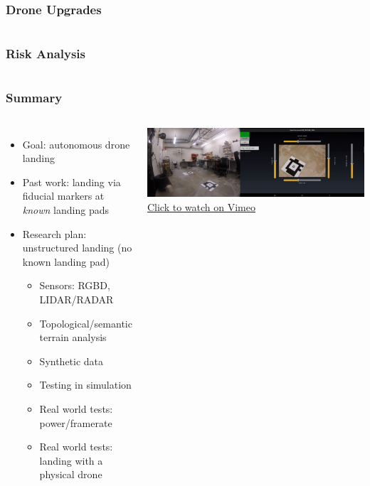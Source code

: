 \documentclass[aspectratio=169]{rubeamer}
\newif\ifpause
\newcommand{\mypause}{\ifpause \pause \fi}
\begin{document}
\begin{frame}
  \frametitle{Drone Upgrades}
  \begin{columns}
    \centering
  \end{columns}
\end{frame}

\begin{frame}
  \frametitle{Risk Analysis}
  \begin{columns}
    \centering
  \end{columns}
\end{frame}

\begin{frame}
  \frametitle{Summary}
  \begin{columns}
      \begin{itemize}
        \mypause
        \item Goal: autonomous drone landing
        \mypause
        \item Past work: landing via fiducial markers at \textit{known} landing pads
        \mypause
        \item Research plan: unstructured landing (no known landing pad)
        \begin{itemize}
          \mypause
          \item Sensors: RGBD, LIDAR/RADAR
          \mypause
          \item Topological/semantic terrain analysis
          \mypause
          \item Synthetic data
          \mypause
          \item Testing in simulation
          \mypause
          \item Real world tests: power/framerate
          \mypause
          \item Real world tests: landing with a physical drone
          \mypause
        \end{itemize}
      \end{itemize}

      \centering

      \onslide
      \includegraphics[width=\textwidth]{demo_screenshot}\\\href{https://vimeo.com/664863992}{\color{blue}Click to watch on Vimeo}\vspace{1cm}


\end{columns}
\end{frame}
\end{document}
